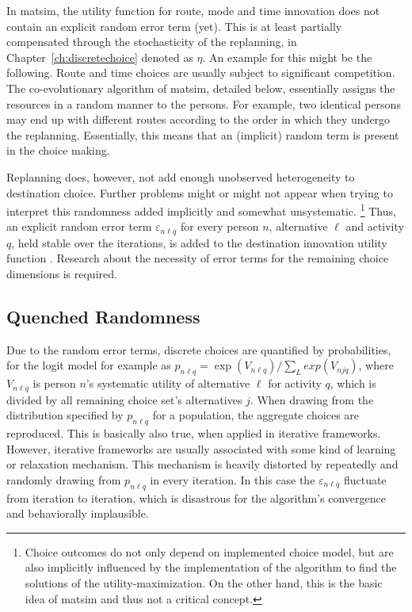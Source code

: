 In \gls{matsim}, the utility function for route, mode and time innovation does not contain an explicit random error term (yet). 
This is at least partially compensated through the stochasticity of the replanning, in Chapter~\ref{ch:discretechoice} denoted as $\eta$.
An example for this might be the following.
Route and time choices are usually subject to significant competition. 
The co-evolutionary algorithm of \gls{matsim}, detailed below, essentially assigns the resources in a random manner to the persons. 
For example, two identical persons may end up with different routes according to the order in which they undergo the replanning. 
Essentially, this means that an (implicit) random term is present in the choice making.

Replanning does, however, not add enough unobserved heterogeneity to destination choice.
Further problems might or might not appear when trying to interpret this randomness added implicitly and somewhat unsystematic.%
\footnote{Choice outcomes do not only depend on implemented choice model, but are also implicitly influenced by the implementation of the algorithm to find the solutions of the utility-maximization. On the other hand, this is the basic idea of \gls{matsim} and thus not a critical concept.
}
Thus, an explicit random error term $\varepsilon_{n\ell q}$ for every person $n$, alternative $\ell$ and activity $q$, held stable over the iterations, is added to the destination innovation utility function \citep[][]{Horni_PhDThesis_2013}. 
Research about the necessity of error terms for the remaining choice dimensions is required.

\subsection{Quenched Randomness}
Due to the random error terms, discrete choices are quantified by probabilities, for the logit model for example as $p_{n\ell q} = \exp(V_{n\ell q}) / \sum_L exp(V_{njq})$, where $V_{n\ell q}$ is person $n$'s systematic utility of alternative $\ell$ for activity $q$, which is divided by all remaining choice set's alternatives $j$. When drawing from the distribution specified by $p_{n\ell q}$ for a population, the aggregate choices are reproduced. 
This is basically also true, when applied in iterative frameworks. 
However, iterative frameworks are usually associated with some kind of learning or relaxation mechanism. 
This mechanism is heavily distorted by repeatedly and randomly drawing from $p_{n\ell q}$ in every iteration. 
In this case the $\varepsilon_{n\ell q}$ fluctuate from iteration to iteration, which is disastrous for the algorithm's convergence and behaviorally implausible.

